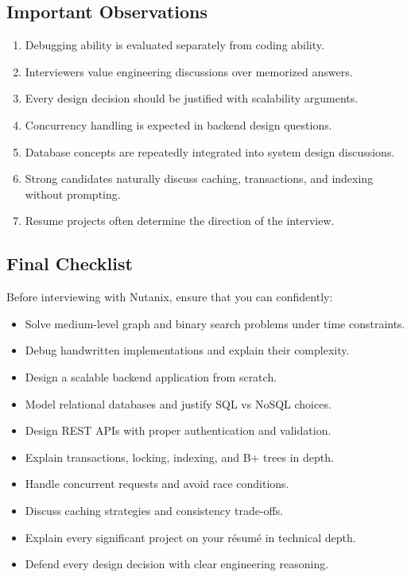 \documentclass[11pt,a4paper]{article}
\begin{document}
\subsection{Important Observations}

\begin{enumerate}
	\item Debugging ability is evaluated separately from coding ability.
	\item Interviewers value engineering discussions over memorized answers.
	\item Every design decision should be justified with scalability arguments.
	\item Concurrency handling is expected in backend design questions.
	\item Database concepts are repeatedly integrated into system design discussions.
	\item Strong candidates naturally discuss caching, transactions, and indexing without prompting.
	\item Resume projects often determine the direction of the interview.
\end{enumerate}


\subsection{Final Checklist}

Before interviewing with Nutanix, ensure that you can confidently:

\begin{itemize}
	\item Solve medium-level graph and binary search problems under time constraints.
	\item Debug handwritten implementations and explain their complexity.
	\item Design a scalable backend application from scratch.
	\item Model relational databases and justify SQL vs NoSQL choices.
	\item Design REST APIs with proper authentication and validation.
	\item Explain transactions, locking, indexing, and B+ trees in depth.
	\item Handle concurrent requests and avoid race conditions.
	\item Discuss caching strategies and consistency trade-offs.
	\item Explain every significant project on your résumé in technical depth.
	\item Defend every design decision with clear engineering reasoning.
\end{itemize}
\end{document}
